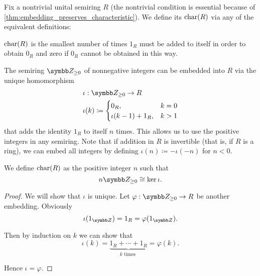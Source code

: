 \begin{definition}\label{def:semiring_characteristic}
  Fix a nontrivial unital semiring \( R \) (the nontrivial condition is essential because of \cref{thm:embedding_preserves_characteristic}). We define its  \( \operatorname{char}(R) \) via any of the equivalent definitions:
  \begin{defenum}
     \( \operatorname{char}(R) \) is the smallest number of times \( 1_R \) must be added to itself in order to obtain \( 0_R \) and zero if \( 0_R \) cannot be obtained in this way.

     The semiring \( \Z_{\geq 0} \) of nonnegative integers can be embedded into \( R \) via the unique homomorphism
    \begin{align*}
      &\iota: \Z_{\geq 0} \to R \\
      &\iota(k) \coloneqq \begin{cases}
        0_R, &k = 0 \\
        \iota(k - 1) + 1_R, &k > 1
      \end{cases}
    \end{align*}
    that adds the identity \( 1_R \) to itself \( n \) times. This allows us to use the positive integers in any semiring. Note that if addition in \( R \) is invertible (that is, if \( R \) is a ring), we can embed all integers by defining \( \iota(n) \coloneqq -\iota(-n) \) for \( n < 0 \).

    We define \( \operatorname{char}(R) \) as the positive integer \( n \) such that
    \begin{equation*}
      n\Z_{\geq 0} \cong \ker\iota.
    \end{equation*}
  \end{defenum}
\end{definition}
\begin{proof}
  We will show that \( \iota \) is unique. Let \( \varphi: \Z_{\geq 0} \to R \) be another embedding. Obviously
  \begin{equation*}
    \iota(1_{\Z}) = 1_R = \varphi(1_{\Z}).
  \end{equation*}

  Then by induction on \( k \) we can show that
  \begin{equation*}
    \iota(k) = \underbrace{1_R + \cdots + 1_R}_{k \text{ times }} = \varphi(k).
  \end{equation*}

  Hence \( \iota = \varphi \).
\end{proof}


